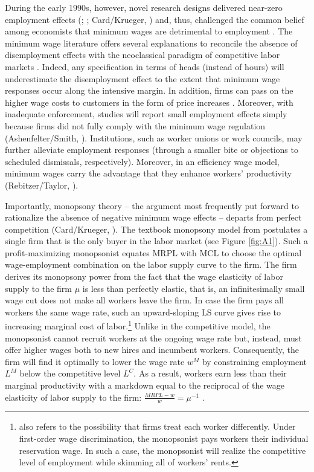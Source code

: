 \documentclass[11pt,oneside,reqno,xcolor=dvipsnames]{article} %
\begin{document}
During the early 1990s, however, novel research designs delivered near-zero employment effects (\citealp{Card1992a}; \citealp{Card1992b}; Card/Krueger, \citeyear{CardKrueger1994}) and, thus, challenged the common belief among economists that minimum wages are detrimental to employment \citep{BrownEtAl1982}. The minimum wage literature offers several explanations to reconcile the absence of disemployment effects with the neoclassical paradigm of competitive labor markets \citep{Schmitt2015}. Indeed, any specification in terms of heads (instead of hours) will underestimate the disemployment effect to the extent that minimum wage responses occur along the intensive margin. In addition, firms can pass on the higher wage costs to customers in the form of price increases \citep{Lemos2008}. Moreover, with inadequate enforcement, studies will report small employment effects simply because firms did not fully comply with the minimum wage regulation (Ashenfelter/Smith, \citeyear{AshenfelterSmith1979}). Institutions, such as worker unions or work councils, may further alleviate employment responses (through a smaller bite or objections to scheduled dismissals, respectively). Moreover, in an efficiency wage model, minimum wages carry the advantage that they enhance workers' productivity (Rebitzer/Taylor, \citeyear{RebitzerTaylor1995}).

Importantly, monopsony theory -- the argument most frequently put forward to rationalize the absence of negative minimum wage effects -- departs from perfect competition (Card/Krueger, \citeyear{CardKrueger1995}). The textbook monopsony model from \citet{Robinson1933} postulates a single firm that is the only buyer in the labor market (see Figure \ref{fig:A1}). Such a profit-maximizing monopsonist equates MRPL with MCL to choose the optimal wage-employment combination on the labor supply curve to the firm. The firm derives its monopsony power from the fact that the wage elasticity of labor supply to the firm $\mu$ is less than perfectly elastic, that is, an infinitesimally small wage cut does not make all workers leave the firm. In case the firm pays all workers the same wage rate, such an upward-sloping LS curve gives rise to increasing marginal cost of labor.\footnote{\citet{Robinson1933} also refers to the possibility that firms treat each worker differently. Under first-order wage discrimination, the monopsonist pays workers their individual reservation wage. In such a case, the monopsonist will realize the competitive level of employment while skimming all of workers' rents.} Unlike in the competitive model, the monopsonist cannot recruit workers at the ongoing wage rate but, instead, must offer higher wages both to new hires and incumbent workers. Consequently, the firm will find it optimally to lower the wage rate $w^{M}$ by constraining employment $L^{M}$ below the competitive level $L^{C}$. As a result, workers earn less than their marginal productivity with a markdown equal to the reciprocal of the wage elasticity of labor supply to the firm: $ \frac{MRPL-w}{w} = \mu^{-1} $ \citep{AshenfelterEtAl2010}.   %
\end{document}
